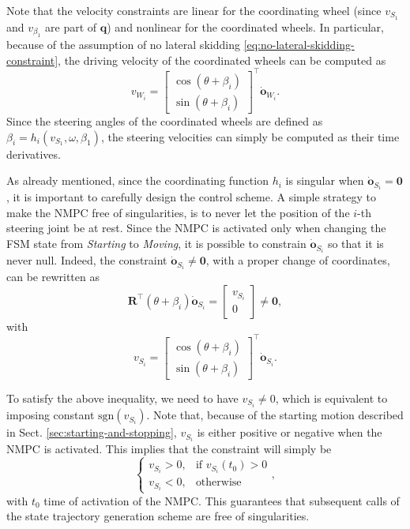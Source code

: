 Note that the velocity constraints are linear for the coordinating wheel
(since $v_{S_1}$ and $v_{\beta_1}$ are part of $\bm{q}$) and nonlinear for the
coordinated wheels. In particular, because of the assumption of no lateral
skidding \eqref{eq:no-lateral-skidding-constraint}, the driving velocity of
the coordinated wheels can be computed as
\begin{equation*}
    v_{W_i} = 
    \begin{bmatrix}
        \cos(\theta + \beta_i) \\
        \sin(\theta + \beta_i)
    \end{bmatrix}^\top \dot{\bm{o}}_{W_i}.
\end{equation*}
Since the steering angles of the coordinated wheels are defined as
$\beta_i=h_i(v_{S_1}, \omega, \beta_1)$, the steering velocities can simply be
computed as their time derivatives.

As already mentioned, since the coordinating function $h_i$ is singular when
$\dot{\bm{o}}_{S_i}=\bm{0}$, it is important to carefully design the control
scheme. A simple strategy to make the NMPC free of singularities, is to never
let the position of the $i$-th steering joint be at rest. Since the NMPC is
activated only when changing the FSM state from \textit{Starting} to
\textit{Moving}, it is possible to constrain $\dot{\bm{o}}_{S_i}$ so that it
is never null. Indeed, the constraint $\dot{\bm{o}}_{S_i} \ne \bm{0}$, with a
proper change of coordinates, can be rewritten as
\begin{equation*}
    \bm{R}^\top(\theta + \beta_i) \dot{\bm{o}}_{S_i} =
    \begin{bmatrix}
        v_{S_i} \\ 0
    \end{bmatrix} \ne \bm{0},
\end{equation*}
with
\begin{equation*}
    v_{S_i} = 
    \begin{bmatrix}
        \cos(\theta + \beta_i) \\
        \sin(\theta + \beta_i)
    \end{bmatrix}^\top \dot{\bm{o}}_{S_i}.
\end{equation*}

To satisfy the above inequality, we need to have $v_{S_i} \ne 0$, which is
equivalent to imposing constant $\mathrm{sgn}(v_{S_i})$. Note that, because of
the starting motion described in Sect. \ref{sec:starting-and-stopping},
$v_{S_i}$ is either positive or negative when the NMPC is activated.
This implies that the constraint will simply be
\begin{equation*}
\begin{cases}
    v_{S_i} > 0, & \text{if $v_{S_i}(t_0)>0$} \\
    v_{S_i} < 0, & \text{otherwise}
\end{cases},
\end{equation*}
with $t_0$ time of activation of the NMPC. This guarantees that subsequent calls of
the state trajectory generation scheme are free of singularities.

